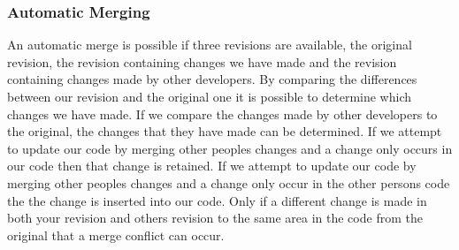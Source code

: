 
\subsubsection{Automatic Merging}
An automatic merge is possible if three revisions are available, the original revision, the revision containing changes we have made and the revision containing changes made by other developers. By comparing the differences between our revision and the original one it is possible to determine which changes we have made.  If we compare the changes made by other developers to the original, the changes that they have made can be determined.  If we attempt to update our code by merging other peoples changes and a change only occurs in our code then that change is retained.  If we attempt to update our code by merging other peoples changes and a change only occur in the other persons code the the change is inserted into our code. Only if a different change is made in both your revision and others revision to the same area in the code from the original that a merge conflict can occur. 


% 

